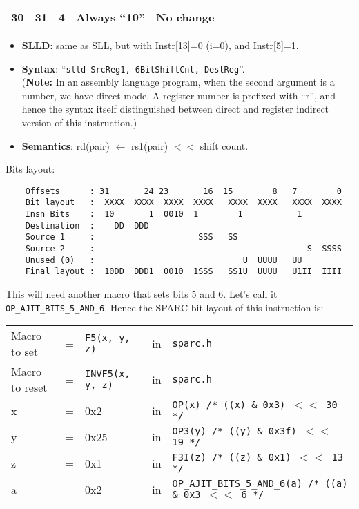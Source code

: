 \begin{enumerate}
\begin{enumerate}
\begin{center}
\begin{tabular}[p]{|c|c|l|p{}|p{}|}
        30 & 31 & 4 & Always ``10'' & No change \\
        \hline
      \end{tabular}
    \end{center}
    \begin{itemize}
    \item []\textbf{SLLD}: same as SLL, but with Instr[13]=0 (i=0),
      and Instr[5]=1.
    \item []\textbf{Syntax}: ``\texttt{slld SrcReg1, 6BitShiftCnt,
        DestReg}''. \\
      (\textbf{Note:} In an assembly language program, when the second
      argument is a number, we have direct mode.  A register number is
      prefixed with  ``r'', and hence the  syntax itself distinguished
      between   direct  and   register   indirect   version  of   this
      instruction.)
    \item []\textbf{Semantics}: rd(pair) $\leftarrow$ rs1(pair) $<<$
      shift count.
    \end{itemize}
    Bits layout:
\begin{verbatim}
    Offsets      : 31       24 23       16  15        8   7        0
    Bit layout   :  XXXX  XXXX  XXXX  XXXX   XXXX  XXXX   XXXX  XXXX
    Insn Bits    :  10       1  0010  1        1           1        
    Destination  :    DD  DDD                                       
    Source 1     :                     SSS   SS
    Source 2     :                                           S  SSSS
    Unused (0)   :                              U  UUUU   UU        
    Final layout :  10DD  DDD1  0010  1SSS   SS1U  UUUU   U1II  IIII
\end{verbatim}

    This will need another macro that sets bits 5 and 6. Let's call it
    \texttt{OP\_AJIT\_BITS\_5\_AND\_6}.   Hence the  SPARC bit  layout of  this
    instruction is:

    \begin{tabular}[h]{lclcl}
      Macro to set  &=& \texttt{F5(x, y, z)} &in& \texttt{sparc.h}     \\
      Macro to reset  &=& \texttt{INVF5(x, y, z)} &in& \texttt{sparc.h}     \\
      x &=& 0x2      &in& \texttt{OP(x)  /* ((x) \& 0x3)  $<<$ 30 */} \\
      y &=& 0x25     &in& \texttt{OP3(y) /* ((y) \& 0x3f) $<<$ 19 */} \\
      z &=& 0x1      &in& \texttt{F3I(z) /* ((z) \& 0x1)  $<<$ 13 */} \\
      a &=& 0x2      &in& \texttt{OP\_AJIT\_BITS\_5\_AND\_6(a) /* ((a) \& 0x3  $<<$ 6 */}
    \end{tabular}


\end{enumerate}
\end{enumerate}
